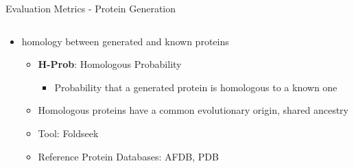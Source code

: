 \begin{frame}[shrink=10]{Evaluation Metrics - Protein Generation}
\begin{columns}
\begin{column}{0.5\textwidth}
\begin{itemize}
\begin{itemize}
					\item Tool: Foldseek
					\item Reference Protein Databases: AFDB, PDB
				\end{itemize}
				\item homology between generated and known proteins
				\begin{itemize}
					\item \textbf{H-Prob}: Homologous Probability
					\begin{itemize}\setlength\itemsep{1em}
						\item Probability that a generated protein is homologous to a known one
					\end{itemize}
					\item Homologous proteins have a common evolutionary origin, shared ancestry
					\item Tool: Foldseek
					\item Reference Protein Databases: AFDB, PDB
				\end{itemize}
			\end{itemize}
		\end{column}
	\end{columns}
\end{frame}